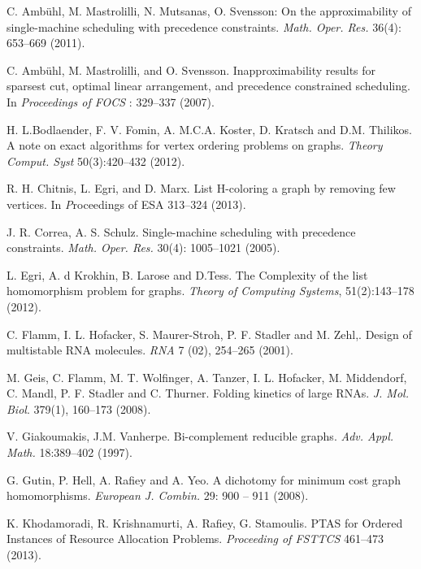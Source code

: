 \documentclass[letterpaper,11pt,abstracton]{scrartcl}
\begin{document}
{\small \begin{thebibliography}{999}




 C. Amb\"uhl, M. Mastrolilli, N. Mutsanas, O. Svensson:
On the approximability of single-machine scheduling with precedence constraints. {\em Math. Oper. Res.} 36(4): 653--669 (2011).

 C. Amb\"uhl, M. Mastrolilli, and O. Svensson.
Inapproximability results for sparsest cut, optimal linear arrangement, and precedence constrained scheduling.
In {\em Proceedings of FOCS} : 329--337 (2007).

 H. L.Bodlaender, F. V. Fomin, A. M.C.A. Koster, D. Kratsch and
D.M. Thilikos. A note on exact algorithms for vertex ordering problems on graphs.
\emph{Theory Comput. Syst} 50(3):420--432 (2012).

 R. H. Chitnis, L. Egri, and D. Marx.
List H-coloring a graph by removing few vertices. In
{\emph Proceedings of ESA } 313--324 (2013).


 J. R. Correa, A. S. Schulz.
Single-machine scheduling with precedence constraints. {\em Math. Oper. Res.} 30(4):
1005--1021 (2005).

L. Egri, A. d Krokhin, B. Larose and D.Tess.
The Complexity of the list homomorphism problem for graphs.
\emph{Theory of Computing Systems}, 51(2):143--178 (2012).


C. Flamm, I. L. Hofacker, S. Maurer-Stroh, P. F. Stadler and M. Zehl,.
Design of multistable RNA molecules.
\emph{RNA} 7 (02), 254--265 (2001).



M. Geis, C. Flamm, M. T. Wolfinger, A. Tanzer, I. L. Hofacker, M. Middendorf, C. Mandl, P. F. Stadler and
C. Thurner.
Folding kinetics of large RNAs.
\emph{J. Mol. Biol}. 379(1), 160--173 (2008).

V. Giakoumakis, J.M. Vanherpe.
Bi-complement reducible graphs.
\emph{Adv. Appl. Math.} 18:389--402 (1997).

 G. Gutin, P. Hell, A. Rafiey and A. Yeo.
	A dichotomy for minimum cost graph homomorphisms.
	\emph{European J. Combin.} 29: 900 -- 911 (2008).



 K. Khodamoradi, R. Krishnamurti, A. Rafiey, G. Stamoulis.
PTAS for Ordered Instances of Resource Allocation Problems. \emph{Proceeding of   FSTTCS}  461--473 (2013).




\end{thebibliography}}
\end{document}
